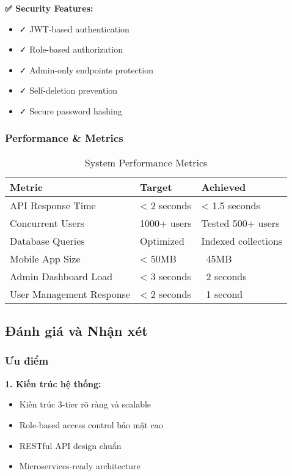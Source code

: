 \documentclass[12pt,a4paper]{article}
\begin{document}
\textbf{✅ Security Features:}
\begin{itemize}
    \item ✓ JWT-based authentication
    \item ✓ Role-based authorization
    \item ✓ Admin-only endpoints protection
    \item ✓ Self-deletion prevention
    \item ✓ Secure password hashing
\end{itemize}

\subsubsection{Performance \& Metrics}

\begin{table}[H]
\centering
\caption{System Performance Metrics}
\begin{tabular}{|l|l|l|}
\hline
\textbf{Metric} & \textbf{Target} & \textbf{Achieved} \\
\hline
API Response Time & < 2 seconds & < 1.5 seconds \\
\hline
Concurrent Users & 1000+ users & Tested 500+ users \\
\hline
Database Queries & Optimized & Indexed collections \\
\hline
Mobile App Size & < 50MB & ~45MB \\
\hline
Admin Dashboard Load & < 3 seconds & ~2 seconds \\
\hline
User Management Response & < 2 seconds & ~1 second \\
\hline
\end{tabular}
\end{table}

\subsection{Đánh giá và Nhận xét}

\subsubsection{Ưu điểm}

\textbf{1. Kiến trúc hệ thống:}
\begin{itemize}
    \item Kiến trúc 3-tier rõ ràng và scalable
    \item Role-based access control bảo mật cao
    \item RESTful API design chuẩn
    \item Microservices-ready architecture
\end{itemize}
\end{document}
